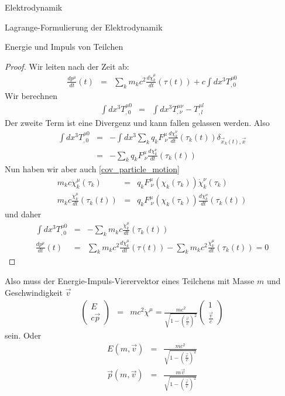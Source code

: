 \begin{chapter}{\titlestr}
\begin{section}{Elektrodynamik}
\begin{subsection}{Lagrange-Formulierung der Elektrodynamik}
\begin{subsubsection}{Energie und Impuls von Teilchen}
\begin{proof}
Wir leiten nach der Zeit ab:
\begin{eqnarray*}
\frac{dp^\mu}{dt}(t) &=& \sum_k m_kc^2 \frac{d\dot{\chi}^\mu_k}{dt}(\tau(t))+c\int dx^3 T^{\mu 0}_{,0}
\end{eqnarray*}
Wir berechnen
\begin{eqnarray*}
\int dx^3 T^{\mu 0}_{,0} &=&\int dx^3 T^{\mu\nu}_{,\nu}-T^{\mu l}_{,l}
\end{eqnarray*}
Der zweite Term ist eine Divergenz und kann fallen gelassen werden. Also
\begin{eqnarray*}
\int dx^3 T^{\mu 0}_{,0} &=&-\int dx^3 \sum_k q_k F^\mu_{\ \nu}\frac{d\chi_k^\nu}{dt}(\tau_k(t))\delta_{\vec{x}_k(t),\vec{x}}\\
&=&-\sum_k q_k F^\mu_{\ \nu}\frac{d\chi_k^\nu}{dt}(\tau_k(t))
\end{eqnarray*}
Nun haben wir aber auch \ref{cov_particle_motion}
\begin{eqnarray*}
m_kc\ddot{\chi}_k^\mu(\tau_k) &=& q_kF^\mu_{\ \nu}(\chi_k(\tau_k))\dot{\chi}_k^\nu(\tau_k)\\
m_kc\frac{\dot{\chi}_k^\mu}{dt}(\tau_k(t)) &=& q_kF^\mu_{\ \nu}(\chi_k(\tau_k))\frac{d\chi_k^\nu}{dt}(\tau_k(t))
\end{eqnarray*}
und daher
\begin{eqnarray*}
\int dx^3 T^{\mu 0}_{,0} &=&-\sum_km_kc\frac{\dot{\chi}_k^\mu}{dt}(\tau_k(t))\\
\frac{dp^\mu}{dt}(t) &=& \sum_k m_kc^2 \frac{d\dot{\chi}^\mu_k}{dt}(\tau(t))-\sum_km_kc^2\frac{\dot{\chi}_k^\mu}{dt}(\tau_k(t))=0
\end{eqnarray*}
\end{proof}
Also muss der Energie-Impuls-Vierervektor eines Teilchens mit Masse $m$ und Geschwindigkeit $\vec{v}$
\begin{eqnarray*}
\begin{pmatrix}
E\\
c\vec{p}
\end{pmatrix}
&=& mc^2 \dot{\chi}^\mu=\frac{mc^2}{\sqrt{1-\left(\frac{\vec{v}}{c}\right)^2}}\begin{pmatrix}
1\\
\frac{\vec{v}}{c}
\end{pmatrix}
\end{eqnarray*}
sein. Oder
\begin{eqnarray*}
E(m,\vec{v}) &=& \frac{mc^2}{\sqrt{1-\left(\frac{\vec{v}}{c}\right)^2}}\\
\vec{p}(m,\vec{v})&=& \frac{m\vec{v}}{\sqrt{1-\left(\frac{\vec{v}}{c}\right)^2}}

\end{eqnarray*}
\end{subsubsection}
\end{subsection}
\end{section}
\end{chapter}
